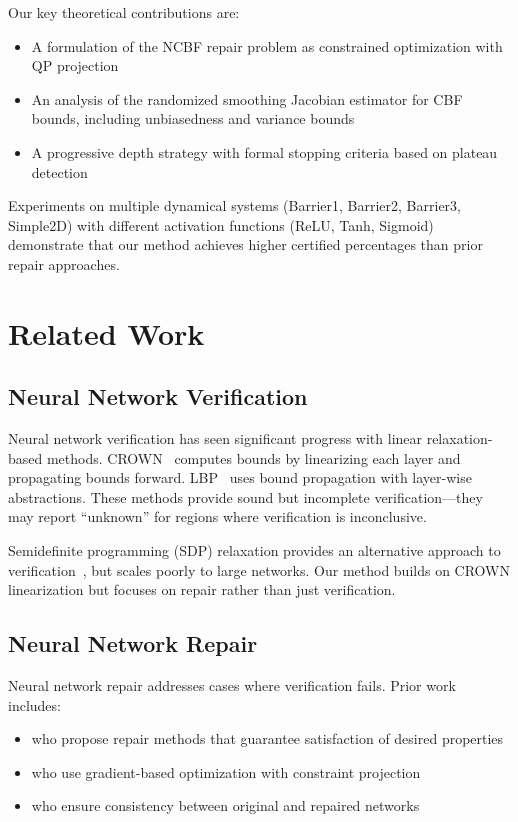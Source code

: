 Our key theoretical contributions are:
\begin{itemize}
    \item A formulation of the NCBF repair problem as constrained optimization with QP projection
    \item An analysis of the randomized smoothing Jacobian estimator for CBF bounds, including unbiasedness and variance bounds
    \item A progressive depth strategy with formal stopping criteria based on plateau detection
\end{itemize}

Experiments on multiple dynamical systems (Barrier1, Barrier2, Barrier3, Simple2D) with different activation functions (ReLU, Tanh, Sigmoid) demonstrate that our method achieves higher certified percentages than prior repair approaches.

\section{Related Work}

\subsection{Neural Network Verification}

Neural network verification has seen significant progress with linear relaxation-based methods. CROWN~\citep{ruppert1998ball, hwang2020crown} computes bounds by linearizing each layer and propagating bounds forward. LBP~\citep{liu2021 certify} uses bound propagation with layer-wise abstractions. These methods provide sound but incomplete verification---they may report ``unknown'' for regions where verification is inconclusive.

Semidefinite programming (SDP) relaxation provides an alternative approach to verification~\citep{fazel2018global}, but scales poorly to large networks. Our method builds on CROWN linearization but focuses on repair rather than just verification.

\subsection{Neural Network Repair}

Neural network repair addresses cases where verification fails. Prior work includes:
\begin{itemize}
    \item \citep{liu2021repair} who propose repair methods that guarantee satisfaction of desired properties
    \item \citep{islam2024repair} who use gradient-based optimization with constraint projection
    \item \citep{dutt2023consistent} who ensure consistency between original and repaired networks
\end{itemize}

